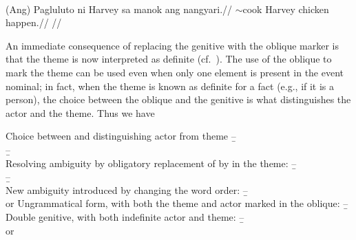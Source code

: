 \\
\begingl
    \gla (Ang) Pagluluto ni Harvey {sa} manok ang nangyari.//
    \glb \Nom{} \Ger{}$\sim$cook \Gen{} Harvey \Obl{} chicken \Nom{} happen.\Pfv{}//
    \glft {}//
\endgl
\xe

An immediate consequence of replacing the genitive  with the oblique
marker  is that the theme is now interpreted as definite
(cf.~\cite[3,\,40]{kaufman2009}). The use of the oblique to mark the theme can
be used even when only one element is present in the event nominal; in fact,
when the theme is known as definite for a fact (e.g., if it is a person), the
choice between the oblique and the genitive is what distinguishes the actor and
the theme. Thus we have

\pex[interpartskip=0pt]
    \a Choice between \Obl{} and \Gen{} distinguishing actor from theme
    \beginsubsub{}
        \b{--}{\\ }
        \b{--}{\\ }
    \endsubsub
    \a Resolving ambiguity by obligatory replacement of \Gen{} by \Obl{} in the theme:
    \beginsubsub
        \b{--}{\\
        }
        \b{--}{\\
        }
    \endsubsub
    \a New ambiguity introduced by changing the word order:
    \beginsubsub
        \b{--} {\\
         or }
    \endsubsub
    \a Ungrammatical form, with both the theme and actor marked in the oblique:
    \beginsubsub
        \b{--}{\ljudge{*}\\
        }
    \endsubsub
    \a Double genitive, with both indefinite actor and theme:
    \beginsubsub
        \b{--}{\\
         or } 
    \endsubsub
\xe



